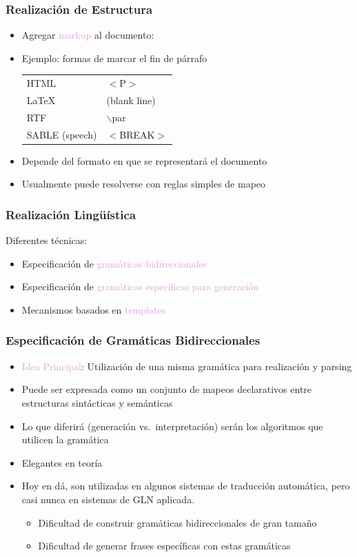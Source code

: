 \documentclass[compress,color=usenames]{beamer}
\newcommand{\mH}[1]{\textcolor{Plum}{#1}}
\begin{document}
\begin{frame}
\frametitle{Realizaci\'on de Estructura}

\begin{itemize}
\item Agregar \mH{markup} al documento:
\item Ejemplo: formas de marcar el fin de p\'arrafo
\begin{center}
\begin{tabular}{ll}
 HTML  &                       \mbox{$<$}P\mbox{$>$}\\
 LaTeX  &                       (blank line)\\
 RTF     &                   \mbox{$\backslash$}par\\
 SABLE (speech) &       \mbox{$<$}BREAK\mbox{$>$}\\
\end{tabular}
\end{center}
\item Depende del formato en que se representar\'a el documento
\item Usualmente puede resolverse con reglas simples de mapeo
\end{itemize}
\end{frame}

\begin{frame}
\frametitle{Realizaci\'on Ling\"u\'istica}

Diferentes t\'ecnicas:
\begin{itemize}
\item Especificaci\'on de \mH{gram\'aticas bidireccionales}
\item Especificaci\'on de \mH{gram\'aticas espec\'ificas para generaci\'on} 
\item Mecanismos basados en \mH{templates}
\end{itemize}
\end{frame}

\begin{frame}
\frametitle{Especificaci\'on de Gram\'aticas Bidireccionales}

\label{f31}
\begin{itemize}
\item \mH{Idea Principal}: Utilizaci\'on de una misma gram\'atica para realizaci\'on y parsing
\item Puede ser expresada como un conjunto de mapeos declarativos entre estructuras sint\'acticas y sem\'anticas
\item Lo que diferir\'a (generaci\'on vs.\ interpretaci\'on) ser\'an los algoritmos que utilicen la gram\'atica 
\item Elegantes en teor\'ia
\item Hoy en d\'a, son utilizadas en algunos sistemas de traducci\'on autom\'atica, pero casi nunca en sistemas de GLN aplicada.
\begin{itemize}
\item Dificultad de construir gram\'aticas bidireccionales de gran tama\~no
\item Dificultad de generar frases espec\'ificas con estas gram\'aticas
\end{itemize}
\end{itemize}
\end{frame}
\end{document}
